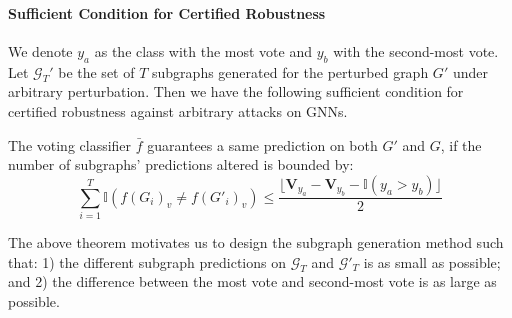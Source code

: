 \paragraph{Sufficient Condition for Certified Robustness} We denote $y_a$ as the class with the most vote and  $y_b$ with the second-most vote.  
Let $\mathcal{G}_T'$ be the set of $T$ subgraphs generated for the perturbed graph $G'$ under arbitrary perturbation. Then we have the following sufficient condition for certified robustness against arbitrary attacks on GNNs.  




\begin{theorem}
\label{thm:Tolerance}
The voting classifier $\bar{f}$ guarantees a same prediction on both $G'$ and $G$, if the number of subgraphs' predictions altered is bounded by:
\begin{equation}
    \sum_{i=1}^{T}\mathbb{I}(f(G_{i})_v\neq f(G'_{i})_v) \leq \frac{\lfloor \mathbf{V}_{y_a}-\mathbf{V}_{y_b}-\mathbb{I}(y_{a}>y_{b})\rfloor}{2}
\end{equation}
\end{theorem}






The above theorem motivates us to design the subgraph generation method such that: 1) the  different subgraph predictions on $\mathcal{G}_T$ and $\mathcal{G}'_T$ is as small as possible; and 2) the difference between the most vote and second-most vote is as large as possible.   


